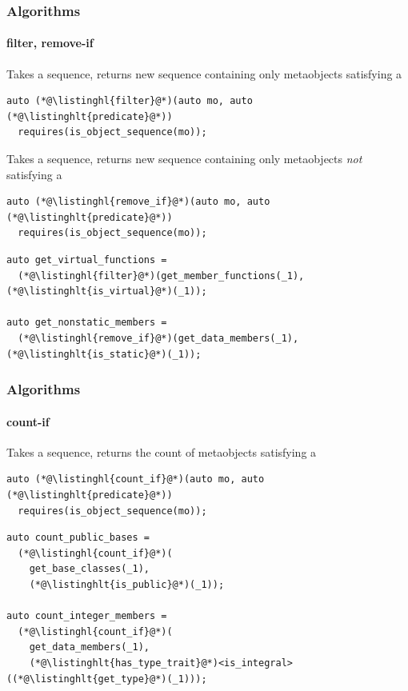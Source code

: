 \documentclass[compress,table,xcolor=table]{beamer}
\begin{document}
\begin{frame}[fragile]
  \frametitle{Algorithms}
  \framesubtitle{filter, remove-if}
  Takes a sequence, returns new sequence containing only metaobjects
  satisfying a 
  \begin{lstlisting}[language=c++2x]
auto (*@\listinghl{filter}@*)(auto mo, auto (*@\listinghlt{predicate}@*))
  requires(is_object_sequence(mo));
  \end{lstlisting}
  \vfill
  Takes a sequence, returns new sequence containing only metaobjects
  {\em not} satisfying a 
  \begin{lstlisting}[language=c++2x]
auto (*@\listinghl{remove_if}@*)(auto mo, auto (*@\listinghlt{predicate}@*))
  requires(is_object_sequence(mo));
  \end{lstlisting}
  \vfill
  \begin{lstlisting}[language=c++2x,basicstyle=\footnotesize\ttfamily]
auto get_virtual_functions =
  (*@\listinghl{filter}@*)(get_member_functions(_1), (*@\listinghlt{is_virtual}@*)(_1));

auto get_nonstatic_members =
  (*@\listinghl{remove_if}@*)(get_data_members(_1), (*@\listinghlt{is_static}@*)(_1));
  \end{lstlisting}
\end{frame}
\begin{frame}[fragile]
  \frametitle{Algorithms}
  \framesubtitle{count-if}
  Takes a sequence, returns the count of metaobjects satisfying
  a 
  \begin{lstlisting}[language=c++2x]
auto (*@\listinghl{count_if}@*)(auto mo, auto (*@\listinghlt{predicate}@*))
  requires(is_object_sequence(mo));
  \end{lstlisting}
  \vfill
  \begin{lstlisting}[language=c++2x,basicstyle=\small\ttfamily]
auto count_public_bases =
  (*@\listinghl{count_if}@*)(
    get_base_classes(_1),
    (*@\listinghlt{is_public}@*)(_1));

auto count_integer_members =
  (*@\listinghl{count_if}@*)(
    get_data_members(_1),
    (*@\listinghlt{has_type_trait}@*)<is_integral>((*@\listinghlt{get_type}@*)(_1)));
  \end{lstlisting}
\end{frame}
\end{document}
